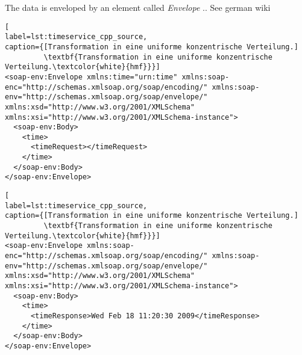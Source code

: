 The data is enveloped by an element called \textit{Envelope} .. See german wiki

\begin{minipage}[t]{\textwidth}
\begin{lstlisting}[
label=lst:timeservice_cpp_source,
caption={[Transformation in eine uniforme konzentrische Verteilung.]
         \textbf{Transformation in eine uniforme konzentrische Verteilung.\textcolor{white}{hmf}}}]
<soap-env:Envelope xmlns:time="urn:time" xmlns:soap-enc="http://schemas.xmlsoap.org/soap/encoding/" xmlns:soap-env="http://schemas.xmlsoap.org/soap/envelope/" xmlns:xsd="http://www.w3.org/2001/XMLSchema" xmlns:xsi="http://www.w3.org/2001/XMLSchema-instance">
  <soap-env:Body>
    <time>
      <timeRequest></timeRequest>
    </time>
  </soap-env:Body>
</soap-env:Envelope>
\end{lstlisting}
\end{minipage}


\begin{minipage}[t]{\textwidth}
\begin{lstlisting}[
label=lst:timeservice_cpp_source,
caption={[Transformation in eine uniforme konzentrische Verteilung.]
         \textbf{Transformation in eine uniforme konzentrische Verteilung.\textcolor{white}{hmf}}}]
<soap-env:Envelope xmlns:soap-enc="http://schemas.xmlsoap.org/soap/encoding/" xmlns:soap-env="http://schemas.xmlsoap.org/soap/envelope/" xmlns:xsd="http://www.w3.org/2001/XMLSchema" xmlns:xsi="http://www.w3.org/2001/XMLSchema-instance">
  <soap-env:Body>
    <time>
      <timeResponse>Wed Feb 18 11:20:30 2009</timeResponse>
    </time>
  </soap-env:Body>
</soap-env:Envelope>
\end{lstlisting}
\end{minipage}













